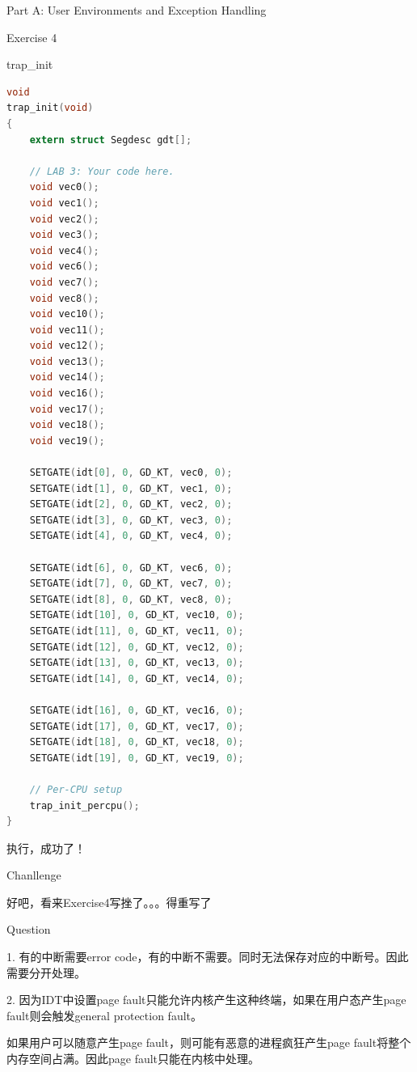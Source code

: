 \documentclass[GBK,winfonts,a4paper,10pt]{ctexart}
\begin{document}
\begin{section}{ Part A: User Environments and Exception Handling }
\begin{subsection}{ Exercise 4 }
\begin{subsubsection}{ trap\_init }
\begin{lstlisting}[language=C]
void
trap_init(void)
{
	extern struct Segdesc gdt[];

	// LAB 3: Your code here.
	void vec0();
	void vec1();
	void vec2();
	void vec3();
	void vec4();
	void vec6();
	void vec7();
	void vec8();
	void vec10();
	void vec11();
	void vec12();
	void vec13();
	void vec14();
	void vec16();	
	void vec17();
	void vec18();
	void vec19();

	SETGATE(idt[0], 0, GD_KT, vec0, 0);
	SETGATE(idt[1], 0, GD_KT, vec1, 0);
	SETGATE(idt[2], 0, GD_KT, vec2, 0);
	SETGATE(idt[3], 0, GD_KT, vec3, 0);
	SETGATE(idt[4], 0, GD_KT, vec4, 0);

	SETGATE(idt[6], 0, GD_KT, vec6, 0);
	SETGATE(idt[7], 0, GD_KT, vec7, 0);
	SETGATE(idt[8], 0, GD_KT, vec8, 0);
	SETGATE(idt[10], 0, GD_KT, vec10, 0);
	SETGATE(idt[11], 0, GD_KT, vec11, 0);
	SETGATE(idt[12], 0, GD_KT, vec12, 0);
	SETGATE(idt[13], 0, GD_KT, vec13, 0);
	SETGATE(idt[14], 0, GD_KT, vec14, 0);

	SETGATE(idt[16], 0, GD_KT, vec16, 0);
	SETGATE(idt[17], 0, GD_KT, vec17, 0);
	SETGATE(idt[18], 0, GD_KT, vec18, 0);
	SETGATE(idt[19], 0, GD_KT, vec19, 0);

	// Per-CPU setup 
	trap_init_percpu();
}
\end{lstlisting}
执行，成功了！
\end{subsubsection}

\end{subsection}

\begin{subsection}{ Chanllenge }
\par
好吧，看来Exercise4写挫了。。。得重写了
\end{subsection}

\begin{subsection}{ Question }
\par
1. 有的中断需要error code，有的中断不需要。同时无法保存对应的中断号。因此需要分开处理。
\par
2. 因为IDT中设置page fault只能允许内核产生这种终端，如果在用户态产生page fault则会触发general protection fault。
\par
如果用户可以随意产生page fault，则可能有恶意的进程疯狂产生page fault将整个内存空间占满。因此page fault只能在内核中处理。
\end{subsection}
\end{section}
\end{document}
